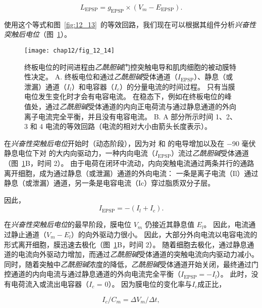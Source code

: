 \begin{equation}\label{excitatory_potential}
	L_{\text{EPSP}} = g_{\text{EPSP}} \times (V_m - E_{\text{EPSP}}).
\end{equation}


使用这个等式和图~\ref{fig:12_13}~的等效回路，我们现在可以根据其组件分析\textit{兴奋性突触后电位}（图~\ref{fig:12_14}）。


\begin{figure}[htbp]
	\centering
	\texttt{[image: chap12/fig\_12\_14]}
	\caption{终板电位的时间进程由\textit{乙酰胆碱}门控突触电导和肌肉细胞的被动膜特性决定。
		A. 终板电位和通过\textit{乙酰胆碱}受体通道（$I_{\text{EPSP}}$）、静息（或泄漏）通道（$ I_l $）和电容器（$ I_c $）的分量电流的时间过程。
		只有当膜电位发生变化时才会有电容电流。
		在稳态下，例如在终板电位的峰值处，通过\textit{乙酰胆碱}受体通道的内向正电荷流与通过静息通道的外向离子电流完全平衡，并且没有电容电流。
		B. A 部分所示时间 1、2、3 和 4 电流的等效回路（电流的相对大小由箭头长度表示）。}
	\label{fig:12_14}
\end{figure}


在\textit{兴奋性突触后电位}开始时（动态阶段），因为对  和  的电导增加以及在 −90 毫伏静息电位下对  的大内向驱动力，一种内向电流（$I_{\text{EPSP}}$）流过\textit{乙酰胆碱}受体通道 （图~\ref{fig:12_14}B，时间 2）。
由于电荷在闭环中流动，内向突触电流通过两条并行的通路离开细胞，成为通过静息（或泄漏）通道的外向电流：
一条是离子电流（Il）通过静息（或泄漏）通道，另一条是电容电流（Ic）穿过脂质双分子层。


因此，
\begin{equation}\label{ionic_current}
	I_{\text{EPSP}} = -(I_l + I_c).
\end{equation}

在\textit{兴奋性突触后电位}的最早阶段，膜电位 $V_m$ 仍接近其静息值 $ E_l $。
因此，电流通过静止通道（$V_m - E_l$）的向外驱动力很小。
因此，大部分外向电流以电容电流的形式离开细胞，膜迅速去极化（图~\ref{fig:12_14}B，时间 2）。 
随着细胞去极化，通过静息通道的电流向外驱动力增加，而通过\textit{乙酰胆碱}受体通道的突触电流向内驱动力减小。
同时，随着突触中\textit{乙酰胆碱}浓度的降低，\textit{乙酰胆碱}受体通道开始关闭，最终通过门控通道的内向电流与通过静息通道的外向电流完全平衡（$I_{\text{EPSP}} = - I_l$）。
此时，没有电荷流入或流出电容器（$ I_c $ = 0）。
因为膜电位的变化率与$ I_c $成正比，


\begin{equation}\label{rate_potential}
	I_c / C_m = \Delta V_m / \Delta t,
\end{equation}

